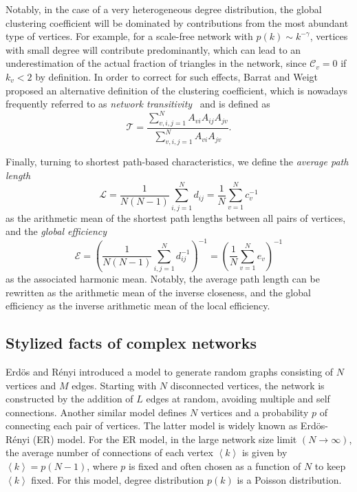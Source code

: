 		Notably, in the case of a very heterogeneous degree distribution, the global clustering coefficient will be dominated by contributions from the most abundant type of vertices. For example, for a scale-free network with $p(k)\sim k^{-\gamma}$, vertices with small degree will contribute predominantly, which can lead to an underestimation of the actual fraction of triangles in the network, since $  {\mathcal{C}}_v =0$ if $  {k}_v <2$ by definition. In order to correct for such effects, Barrat and Weigt~\cite{Barrat2000} proposed an alternative definition of the clustering coefficient, which is nowadays frequently referred to as \textit{network transitivity}~\cite{Boccaletti2006} and is defined as
\begin{equation}
  {\mathcal{T}} = \frac{\sum_{v,i,j=1}^N A_{vi}  A_{ij}  A_{jv} }{\sum_{v,i,j=1}^N A_{vi}  A_{jv} }.
\label{eq:transitivity}
\end{equation}
\noindent


	Finally, turning to shortest path-based characteristics, we define the \textit{average path length}
\begin{equation}
  {\mathcal{L}} =\frac{1}{N(N-1)} \sum_{i,j=1}^N   {d}_{ij}  = \frac{1}{N} \sum_{v=1}^N   {c}_v ^{-1}
\label{eq:apl}
\end{equation}
\noindent
as the arithmetic mean of the shortest path lengths between all pairs of vertices, and the \textit{global efficiency}
\begin{equation} 
  {\mathcal{E}} =\left(\frac{1}{N(N-1)} \sum_{i,j=1}^N   {d}_{ij} ^{-1} \right)^{-1} = \left( \frac{1}{N} \sum_{v=1}^N   {e}_v  \right)^{-1}
\label{eq:globefficiency}
\end{equation}
\noindent
as the associated harmonic mean. Notably, the average path length can be rewritten as the arithmetic mean of the inverse closeness, and the global efficiency as the inverse arithmetic mean of the local efficiency.         

	\subsection{Stylized facts of complex networks} \label{sec:styleFacts}
	Erd\"os and R\'enyi \cite{Erdos1959} introduced a model to generate random graphs consisting of $N$ vertices and $M$ edges. Starting with $N$ disconnected vertices, the network is constructed by the addition of $L$ edges at random, avoiding multiple and self connections. Another similar model defines $N$ vertices and a probability $p$ of connecting each pair of vertices. The latter model is widely known as Erd\"os-R\'enyi (ER) model. For the ER model, in the large network size limit $(N \to \infty)$, the average number of connections of each vertex $\left < k \right>$ is given by $\left< k \right > = p (N - 1)$,  where $p$ is fixed  and often chosen as a function of $N$ to keep $\left < k \right >$ fixed. For this model, degree distribution $p(k)$ is a Poisson distribution. 
	
